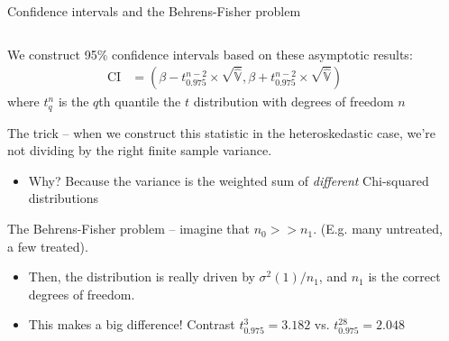 \documentclass[notes,11pt, aspectratio=169]{beamer}
\newenvironment{wideitemize}{\itemize\addtolength{\itemsep}{10pt}}{\enditemize}
\begin{document}
\begin{frame}{Confidence intervals and the Behrens-Fisher problem}
\begin{columns}[T] %
\begin{column}{.9\textwidth}
  \begin{wideitemize}
  \item We construct 95\% confidence intervals based on these asymptotic results:
    \begin{align*}
      \text{CI} &= \left(\beta - t^{n-2}_{0.975}\times \sqrt{\hat{\mathbb{V}}}, \beta + t^{n-2}_{0.975}\times \sqrt{\hat{\mathbb{V}}}\right)
      \end{align*}
      where $t^{n}_{q}$ is the $q$th quantile the $t$ distribution with degrees of freedom $n$
    \item The trick -- when we construct this statistic in the
      heteroskedastic case, we're not dividing by the right finite
      sample variance.
      \begin{itemize}
      \item Why? Because the variance is the weighted sum of \emph{different} Chi-squared distributions
      \end{itemize}
    \item The Behrens-Fisher problem -- imagine that $n_{0} >> n_{1}$. (E.g. many untreated, a few treated).
      \begin{itemize}
      \item Then, the distribution is really driven by $\sigma^{2}(1)/n_{1}$, and $n_{1}$ is the correct degrees of freedom.
      \item This makes a big difference! Contrast $t^{3}_{0.975} = 3.182$  vs. $t^{28}_{0.975}=2.048$
      \end{itemize}
  \end{wideitemize}
  \end{column}%
  \hfill%
  \begin{column}{.5\textwidth}
  \end{column}
\end{columns}
\end{frame}
\end{document}
